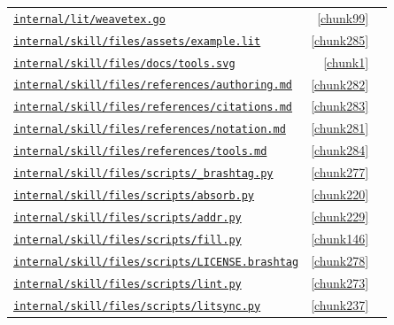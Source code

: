 \documentclass[10pt,a4paper]{article}
\newcounter{chunk}
\begin{document}
\begin{longtable}{@{}p{}rp{}@{}}
\hyperref[chunk99]{\texttt{internal/\allowbreak{}lit/\allowbreak{}weavetex.\allowbreak{}go}} & \ref*{chunk99} &  \\
\hyperref[chunk285]{\texttt{internal/\allowbreak{}skill/\allowbreak{}files/\allowbreak{}assets/\allowbreak{}example.\allowbreak{}lit}} & \ref*{chunk285} &  \\
\hyperref[chunk1]{\texttt{internal/\allowbreak{}skill/\allowbreak{}files/\allowbreak{}docs/\allowbreak{}tools.\allowbreak{}svg}} & \ref*{chunk1} &  \\
\hyperref[chunk282]{\texttt{internal/\allowbreak{}skill/\allowbreak{}files/\allowbreak{}references/\allowbreak{}authoring.\allowbreak{}md}} & \ref*{chunk282} &  \\
\hyperref[chunk283]{\texttt{internal/\allowbreak{}skill/\allowbreak{}files/\allowbreak{}references/\allowbreak{}citations.\allowbreak{}md}} & \ref*{chunk283} &  \\
\hyperref[chunk281]{\texttt{internal/\allowbreak{}skill/\allowbreak{}files/\allowbreak{}references/\allowbreak{}notation.\allowbreak{}md}} & \ref*{chunk281} &  \\
\hyperref[chunk284]{\texttt{internal/\allowbreak{}skill/\allowbreak{}files/\allowbreak{}references/\allowbreak{}tools.\allowbreak{}md}} & \ref*{chunk284} &  \\
\hyperref[chunk277]{\texttt{internal/\allowbreak{}skill/\allowbreak{}files/\allowbreak{}scripts/\allowbreak{}\_\allowbreak{}brashtag.\allowbreak{}py}} & \ref*{chunk277} &  \\
\hyperref[chunk220]{\texttt{internal/\allowbreak{}skill/\allowbreak{}files/\allowbreak{}scripts/\allowbreak{}absorb.\allowbreak{}py}} & \ref*{chunk220} &  \\
\hyperref[chunk229]{\texttt{internal/\allowbreak{}skill/\allowbreak{}files/\allowbreak{}scripts/\allowbreak{}addr.\allowbreak{}py}} & \ref*{chunk229} &  \\
\hyperref[chunk146]{\texttt{internal/\allowbreak{}skill/\allowbreak{}files/\allowbreak{}scripts/\allowbreak{}fill.\allowbreak{}py}} & \ref*{chunk146} &  \\
\hyperref[chunk278]{\texttt{internal/\allowbreak{}skill/\allowbreak{}files/\allowbreak{}scripts/\allowbreak{}LICENSE.\allowbreak{}brashtag}} & \ref*{chunk278} &  \\
\hyperref[chunk273]{\texttt{internal/\allowbreak{}skill/\allowbreak{}files/\allowbreak{}scripts/\allowbreak{}lint.\allowbreak{}py}} & \ref*{chunk273} &  \\
\hyperref[chunk237]{\texttt{internal/\allowbreak{}skill/\allowbreak{}files/\allowbreak{}scripts/\allowbreak{}litsync.\allowbreak{}py}} & \ref*{chunk237} &  \\

\end{longtable}
\end{document}
